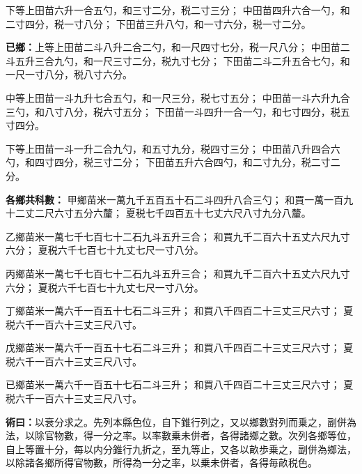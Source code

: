 \documentclass[11pt,a4paper]{article}
\newcommand{\Method}[1]{\par\noindent\textbf{\color{methodcolor}術曰：}#1\par}
\begin{document}
{下等上田苗六升一合五勺，和三寸二分，税二寸三分；
中田苗四升六合一勺，和二寸四分，税一寸八分；
下田苗三升八勺，和一寸六分，税一寸二分。

\textbf{已鄉：}上等上田苗二斗八升二合二勺，和一尺四寸七分，税一尺八分；
中田苗二斗五升三合九勺，和一尺三寸二分，税九寸七分；
下田苗二斗二升五合七勺，和一尺一寸八分，税八寸六分。

中等上田苗一斗九升七合五勺，和一尺三分，税七寸五分；
中田苗一斗六升九合三勺，和八寸八分，税六寸五分；
下田苗一斗四升一合一勺，和七寸四分，税五寸四分。

下等上田苗一斗一升二合九勺，和五寸九分，税四寸三分；
中田苗八升四合六勺，和四寸四分，税三寸二分；
下田苗五升六合四勺，和二寸九分，税二寸二分。

\textbf{各鄉共科數：}
甲鄉苗米一萬九千五百五十石二斗四升八合三勺；
和買一萬一百九十二丈二尺六寸五分六釐；
夏税七千四百五十七丈六尺八寸九分八釐。

乙鄉苗米一萬七千七百七十二石九斗五升三合；
和買九千二百六十五丈六尺九寸六分；
夏税六千七百七十九丈七尺一寸八分。

丙鄉苗米一萬七千七百七十二石九斗五升三合；
和買九千二百六十五丈六尺九寸六分；
夏税六千七百七十九丈七尺一寸八分。

丁鄉苗米一萬六千一百五十七石二斗三升；
和買八千四百二十三丈三尺六寸；
夏税六千一百六十三丈三尺八寸。

戊鄉苗米一萬六千一百五十七石二斗三升；
和買八千四百二十三丈三尺六寸；
夏税六千一百六十三丈三尺八寸。

已鄉苗米一萬六千一百五十七石二斗三升；
和買八千四百二十三丈三尺六寸；
夏税六千一百六十三丈三尺八寸。
}

\Method{以衰分求之。先列本縣色位，自下錐行列之，又以鄉數對列而乗之，副併為法，以除官物數，得一分之率。以率數乗未併者，各得諸鄉之數。次列各鄉等位，自上等置十分，每以内分錐行九折之，至九等止，又各以畝歩乗之，副併為鄉法，以除諸各鄉所得官物數，所得為一分之率，以乗未併者，各得毎畝税色。}
\end{document}
